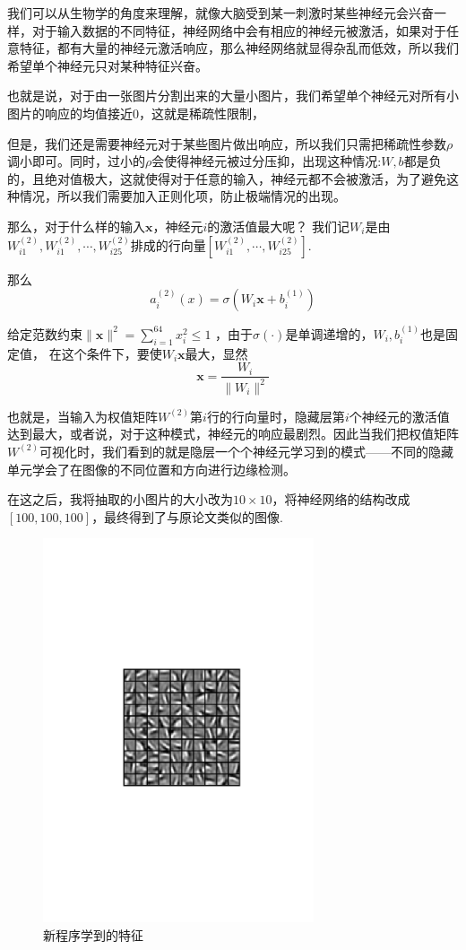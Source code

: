 我们可以从生物学的角度来理解，就像大脑受到某一刺激时某些神经元会兴奋一样，对于输入数据的不同特征，神经网络中会有相应的神经元被激活，如果对于任意特征，都有大量的神经元激活响应，那么神经网络就显得杂乱而低效，所以我们希望单个神经元只对某种特征兴奋。

也就是说，对于由一张图片分割出来的大量小图片，我们希望单个神经元对所有小图片的响应的均值接近0，这就是稀疏性限制，

但是，我们还是需要神经元对于某些图片做出响应，所以我们只需把稀疏性参数$\rho$调小即可。同时，过小的$\rho$会使得神经元被过分压抑，出现这种情况:$W,b$都是负的，且绝对值极大，这就使得对于任意的输入，神经元都不会被激活，为了避免这种情况，所以我们需要加入正则化项，防止极端情况的出现。

那么，对于什么样的输入$\bm{x}$，神经元$i$的激活值最大呢？
我们记$W_i$是由$W^{(2)}_{i1},W^{(2)}_{i1},\cdots,W^{(2)}_{i25}$排成的行向量$[W^{(2)}_{i1},\cdots,W^{(2)}_{i25}]$.

那么
\[a_i^{(2)}(x)=\sigma\left( W_{i}\bm{x}  + b^{(1)}_i \right)\]


给定范数约束$ \|\bm{x}\|^2 = \sum_{i=1}^{64} x_i^2 \leq 1$ ，由于$\sigma(\cdot)$是单调递增的，$W_i,b^{(1)}_i$也是固定值，
在这个条件下，要使$ W_{i}\bm{x}$最大，显然
\[\bm{x}=\dfrac{W_{i}}{ \|W_{i}\|^2}\]

也就是，当输入为权值矩阵$W^{(2)}$第$i$行的行向量时，隐藏层第$i$个神经元的激活值达到最大，或者说，对于这种模式，神经元的响应最剧烈。因此当我们把权值矩阵$W^{(2)}$可视化时，我们看到的就是隐层一个个神经元学习到的模式——不同的隐藏单元学会了在图像的不同位置和方向进行边缘检测。

在这之后，我将抽取的小图片的大小改为$10\times10$，将神经网络的结构改成$[100,100,100]$，最终得到了与原论文类似的图像.

\begin{figure}[H]
\centering
\includegraphics[width=8cm]{fig/s5.pdf}
\caption{新程序学到的特征}
\end{figure}



